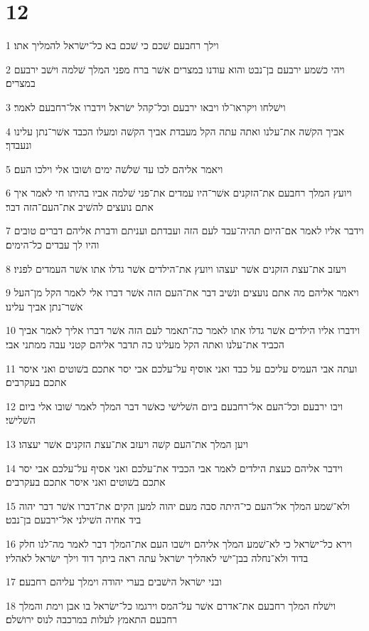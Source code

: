 \chapter{12}

\par 1 וילך רחבעם שׁכם כי שׁכם בא כל־ישׂראל להמליך אתו׃
\par 2 ויהי כשׁמע ירבעם בן־נבט והוא עודנו במצרים אשׁר ברח מפני המלך שׁלמה וישׁב ירבעם במצרים׃
\par 3 וישׁלחו ויקראו־לו ויבאו ירבעם וכל־קהל ישׂראל וידברו אל־רחבעם לאמר׃
\par 4 אביך הקשׁה את־עלנו ואתה עתה הקל מעבדת אביך הקשׁה ומעלו הכבד אשׁר־נתן עלינו ונעבדך׃
\par 5 ויאמר אליהם לכו עד שׁלשׁה ימים ושׁובו אלי וילכו העם׃
\par 6 ויועץ המלך רחבעם את־הזקנים אשׁר־היו עמדים את־פני שׁלמה אביו בהיתו חי לאמר איך אתם נועצים להשׁיב את־העם־הזה דבר׃
\par 7 וידבר אליו לאמר אם־היום תהיה־עבד לעם הזה ועבדתם ועניתם ודברת אליהם דברים טובים והיו לך עבדים כל־הימים׃
\par 8 ויעזב את־עצת הזקנים אשׁר יעצהו ויועץ את־הילדים אשׁר גדלו אתו אשׁר העמדים לפניו׃
\par 9 ויאמר אליהם מה אתם נועצים ונשׁיב דבר את־העם הזה אשׁר דברו אלי לאמר הקל מן־העל אשׁר־נתן אביך עלינו׃
\par 10 וידברו אליו הילדים אשׁר גדלו אתו לאמר כה־תאמר לעם הזה אשׁר דברו אליך לאמר אביך הכביד את־עלנו ואתה הקל מעלינו כה תדבר אליהם קטני עבה ממתני אבי׃
\par 11 ועתה אבי העמיס עליכם על כבד ואני אוסיף על־עלכם אבי יסר אתכם בשׁוטים ואני איסר אתכם בעקרבים׃
\par 12 ויבו ירבעם וכל־העם אל־רחבעם ביום השׁלישׁי כאשׁר דבר המלך לאמר שׁובו אלי ביום השׁלישׁי׃
\par 13 ויען המלך את־העם קשׁה ויעזב את־עצת הזקנים אשׁר יעצהו׃
\par 14 וידבר אליהם כעצת הילדים לאמר אבי הכביד את־עלכם ואני אסיף על־עלכם אבי יסר אתכם בשׁוטים ואני איסר אתכם בעקרבים׃
\par 15 ולא־שׁמע המלך אל־העם כי־היתה סבה מעם יהוה למען הקים את־דברו אשׁר דבר יהוה ביד אחיה השׁילני אל־ירבעם בן־נבט׃
\par 16 וירא כל־ישׂראל כי לא־שׁמע המלך אליהם וישׁבו העם את־המלך דבר לאמר מה־לנו חלק בדוד ולא־נחלה בבן־ישׁי לאהליך ישׂראל עתה ראה ביתך דוד וילך ישׂראל לאהליו׃
\par 17 ובני ישׂראל הישׁבים בערי יהודה וימלך עליהם רחבעם׃
\par 18 וישׁלח המלך רחבעם את־אדרם אשׁר על־המס וירגמו כל־ישׂראל בו אבן וימת והמלך רחבעם התאמץ לעלות במרכבה לנוס ירושׁלם׃

